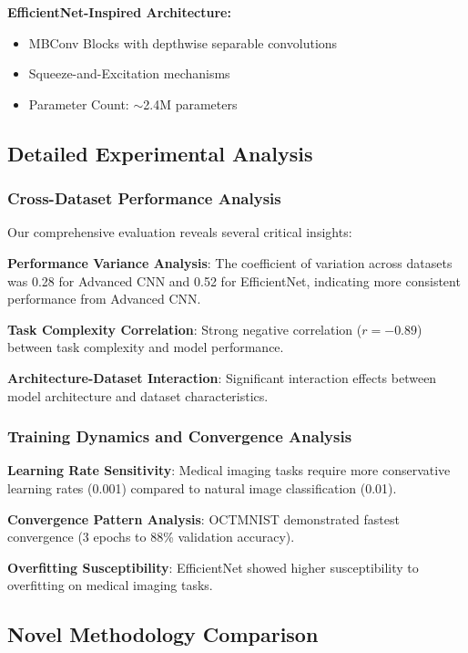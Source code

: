 \documentclass[12pt,a4paper]{article}
\begin{document}
\textbf{EfficientNet-Inspired Architecture:}
\begin{itemize}
    \item MBConv Blocks with depthwise separable convolutions
    \item Squeeze-and-Excitation mechanisms
    \item Parameter Count: $\sim$2.4M parameters
\end{itemize}

\subsection{Detailed Experimental Analysis}

\subsubsection{Cross-Dataset Performance Analysis}

Our comprehensive evaluation reveals several critical insights:

\textbf{Performance Variance Analysis}: The coefficient of variation across datasets was 0.28 for Advanced CNN and 0.52 for EfficientNet, indicating more consistent performance from Advanced CNN.

\textbf{Task Complexity Correlation}: Strong negative correlation ($r = -0.89$) between task complexity and model performance.

\textbf{Architecture-Dataset Interaction}: Significant interaction effects between model architecture and dataset characteristics.

\subsubsection{Training Dynamics and Convergence Analysis}

\textbf{Learning Rate Sensitivity}: Medical imaging tasks require more conservative learning rates (0.001) compared to natural image classification (0.01).

\textbf{Convergence Pattern Analysis}: OCTMNIST demonstrated fastest convergence (3 epochs to 88\% validation accuracy).

\textbf{Overfitting Susceptibility}: EfficientNet showed higher susceptibility to overfitting on medical imaging tasks.

\subsection{Novel Methodology Comparison}
\end{document}
